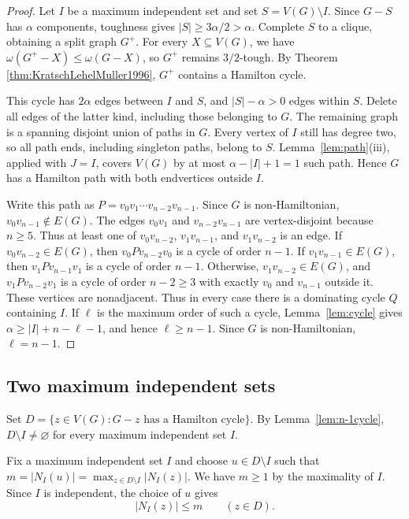 \documentclass[11pt]{article}
\numberwithin{equation}{section}
\theoremstyle{plain}
\theoremstyle{definition}
\theoremstyle{plain}
\begin{document}
\begin{proof}
Let $I$ be a maximum independent set and   set $S=V(G)\setminus I$.
Since $G-S$ has $\alpha$ components, toughness gives
$|S|\geq 3\alpha/2>\alpha$.
Complete $S$ to a clique, obtaining a split graph $G^+$.
For every $X\subseteq V(G)$, we have
$\omega(G^+-X)\leq\omega(G-X)$, so $G^+$ remains $3/2$-tough.
By Theorem \ref{thm:KratschLehelMuller1996}, $G^+$ contains
a Hamilton cycle.

This cycle has $2\alpha$ edges between $I$ and $S$, and
$|S|-\alpha>0$ edges within $S$.
Delete all edges of the latter kind, including those belonging to $G$.
The remaining graph is a spanning disjoint union of paths in $G$.
Every vertex of $I$ still has degree two, so all path ends, including
singleton paths, belong to $S$.
Lemma~\ref{lem:path}\textup{(iii)}, applied with $J=I$, covers
$V(G)$ by at most $\alpha-|I|+1=1$ such path. Hence $G$ has a
Hamilton path with both endvertices outside $I$.

Write this path as
$P=v_0v_1\cdots v_{n-2}v_{n-1}$.
Since $G$ is non-Hamiltonian,
$v_0v_{n-1}\notin E(G)$.
The edges $v_0v_1$ and $v_{n-2}v_{n-1}$ are vertex-disjoint
because $n\geq5$.
Thus at least one of
$v_0v_{n-2}$, $v_1v_{n-1}$, and $v_1v_{n-2}$ is an edge.
If $v_0v_{n-2}\in E(G)$, then
$v_0Pv_{n-2}v_0$ is a cycle of order $n-1$.
If $v_1v_{n-1}\in E(G)$, then
$v_1Pv_{n-1}v_1$ is a cycle of order $n-1$.
Otherwise, $v_1v_{n-2}\in E(G)$, and
$v_1Pv_{n-2}v_1$ is a cycle of order $n-2\geq3$
with exactly $v_0$ and $v_{n-1}$ outside it. These vertices are
nonadjacent. Thus in every case there is a dominating cycle $Q$
containing $I$.
If $\ell$ is the maximum order of such a cycle,
Lemma~\ref{lem:cycle} gives
$\alpha\geq |I|+n-\ell-1$, and hence $\ell\geq n-1$.
Since $G$ is non-Hamiltonian, $\ell=n-1$.

\end{proof}


\subsection{Two maximum independent sets}
\label{subsec:extremal-pair}

Set
 $D=\{z\in V(G):G-z\text{ has a Hamilton cycle}\}$.
By Lemma~\ref{lem:n-1cycle}, $D\setminus I\neq\varnothing$
for every maximum independent set $I$.

Fix a maximum independent set $I$ and choose $u\in D\setminus I$ such
that
 $m=|N_I(u)|=\max_{z\in D\setminus I}|N_I(z)|$.
We have $m\geq 1$ by the maximality of $I$.
Since $I$ is independent, the choice of $u$    gives
\begin{equation}\label{eq:s3-D-bound}
 |N_I(z)|\leq m\qquad(z\in D).
\end{equation}
\end{document}
